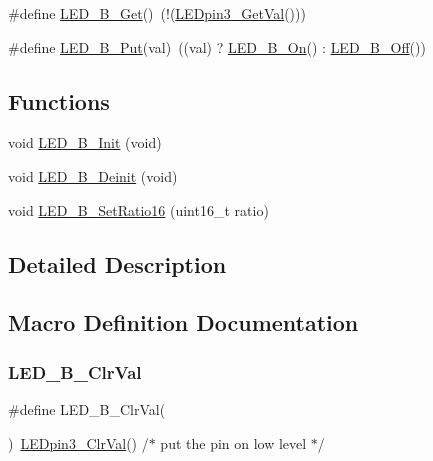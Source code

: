 \begin{DoxyCompactItemize}
\item 
\#define \hyperlink{group___l_e_d___b__module_ga65df5ce04d1666f7ce8ee83299e50a5b}{L\+E\+D\+\_\+\+B\+\_\+\+Get}()~(!(\hyperlink{group___l_e_dpin3__module_gab6cfe66ad8b299ff936ff5030d9960d5}{L\+E\+Dpin3\+\_\+\+Get\+Val}()))
\item 
\#define \hyperlink{group___l_e_d___b__module_gaf7207bb32fdd7d0265294f50d13840f7}{L\+E\+D\+\_\+\+B\+\_\+\+Put}(val)~((val) ? \hyperlink{group___l_e_d___b__module_gac6832625f88e33df89031f708d6002b4}{L\+E\+D\+\_\+\+B\+\_\+\+On}() \+: \hyperlink{group___l_e_d___b__module_gac0f54506e1940c3cd88c1f653f2554a4}{L\+E\+D\+\_\+\+B\+\_\+\+Off}())
\end{DoxyCompactItemize}
\subsection*{Functions}
\begin{DoxyCompactItemize}
\item 
void \hyperlink{group___l_e_d___b__module_gaf192f84bee1a616405e508f1b85c754d}{L\+E\+D\+\_\+\+B\+\_\+\+Init} (void)
\item 
void \hyperlink{group___l_e_d___b__module_ga29cc23f8c253a629f7f2fb8b52b4c460}{L\+E\+D\+\_\+\+B\+\_\+\+Deinit} (void)
\item 
void \hyperlink{group___l_e_d___b__module_gac8a67e9bd6eb62c194536c5d15b5d4a1}{L\+E\+D\+\_\+\+B\+\_\+\+Set\+Ratio16} (uint16\+\_\+t ratio)
\end{DoxyCompactItemize}


\subsection{Detailed Description}


\subsection{Macro Definition Documentation}
\mbox{\label{group___l_e_d___b__module_gaea0844172b02a5aa5a6866bbbafaf54b}} 
\subsubsection{\texorpdfstring{L\+E\+D\+\_\+\+B\+\_\+\+Clr\+Val}{LED\_B\_ClrVal}}
{\footnotesize\ttfamily \#define L\+E\+D\+\_\+\+B\+\_\+\+Clr\+Val(\begin{DoxyParamCaption}{ }\end{DoxyParamCaption})~\hyperlink{group___l_e_dpin3__module_ga4a1dbfa4a99a042a095f0e4c9f192f52}{L\+E\+Dpin3\+\_\+\+Clr\+Val}() /$\ast$ put the pin on low level $\ast$/}

